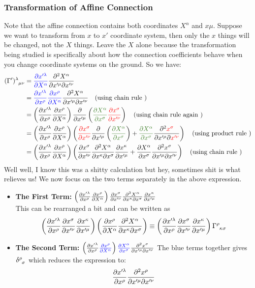 \subsubsection{Transformation of Affine Connection}
Note that the affine connection contains both coordinates $X^\alpha$ and $x\mu$. Suppose we want to transform from $x$ to $x'$ coordinate system, then only the $x$ things will be changed, not the $X$ things. Leave the $X$ alone because the transformation being studied is specifically about how the connection coefficients behave when you change coordinate systems on the ground. So we have:
\begin{align*}
    \tensor{(\Gamma')}{^\lambda _\mu _\nu} &= \mathcolor{blue}{\pdv{x'^\lambda}{X^\alpha}}\pdv{X^\alpha}{x'^\mu}{x'^\nu}\\
    &= \mathcolor{blue}{\pdv{x'^\lambda}{x^\rho}\pdv{x^\rho}{X^\alpha}}\pdv{X^\alpha}{x'^\mu}{x'^\nu} \quad \text{(using chain rule )}\\
    &=\brac{\pdv{x'^\lambda}{x^\rho}\pdv{x^\rho}{X^\alpha}} \pdv{x'^\mu}\brac{\mathcolor{OliveGreen}{\pdv{X^\alpha}{x^\sigma}}\mathcolor{red}{ \pdv{x^\sigma}{x'^\nu}}} \quad \text{(using chain rule again )}\\
    &=\brac{\pdv{x'^\lambda}{x^\rho}\pdv{x^\rho}{X^\alpha}}\brac{ { \mathcolor{red}{\pdv{x^\sigma}{x'^\nu}}\pdv{x'^\mu}\brac{\mathcolor{OliveGreen}{\pdv{X^\alpha}{x^\sigma}}} + \mathcolor{OliveGreen}{\pdv{X^\alpha}{x^\sigma}}\pdv{\mathcolor{red}{x^\sigma}}{x'^\mu}{\mathcolor{red}{x'^\nu}}}}\quad \text{(using product rule )}\\
    &=\brac{\pdv{x'^\lambda}{x^\rho}\pdv{x^\rho}{X^\alpha}} \brac{\pdv{x^\sigma}{x'^\nu} \pdv{X^\alpha}{x^\kappa}{x^\sigma}\pdv{x^\kappa}{x'^\mu}+ \pdv{X^\alpha}{x^\sigma}\pdv{x^\sigma}{x'^\mu}{x'^\nu}}\quad \text{(using chain rule )}
\end{align*}
Well well, I know this was a shitty calculation but hey, sometimes shit is what relieves us! We now focus on the two terms separately in the above expression. 
\begin{itemize}
    \item \textbf{The First Term:} $\left( \pdv{x'^\lambda}{x^\rho}\pdv{x^\rho}{X^\alpha} \right)\pdv{x^\sigma}{x'^\nu} \pdv{X^\alpha}{x^\kappa}{x^\sigma}\pdv{x^\kappa}{x'^\mu}$\\[0.3cm]
This can be rearranged a bit and can be written as 
$$   \brac{\pdv{x'^\lambda}{x^\rho}\pdv{x^\sigma}{x'^\nu} \pdv{x^\kappa}{x'^\mu}}   \brac{\pdv{x^\rho}{X^\alpha}\pdv{X^\alpha}{x^\kappa}{x^\sigma}} \equiv \brac{\pdv{x'^\lambda}{x^\rho}\pdv{x^\sigma}{x'^\nu} \pdv{x^\kappa}{x'^\mu}}  \tensor{\Gamma}{^\rho _\kappa _\sigma}$$
\item \textbf{The Second Term:} $\brac{\pdv{x'^\lambda}{x^\rho}\mathcolor{blue}{\pdv{x^\rho}{X^\alpha}}}\mathcolor{blue}{\pdv{X^\alpha}{x^\sigma}}\pdv{x^\sigma}{x'^\mu}{x'^\nu}$
The blue terms together gives $\tensor{\delta}{^\rho _\sigma}$ which reduces the expression to:
$$\pdv{x'^\lambda}{x^\rho}\pdv{x^\rho}{x'^\mu}{x'^\nu}$$
\end{itemize}

